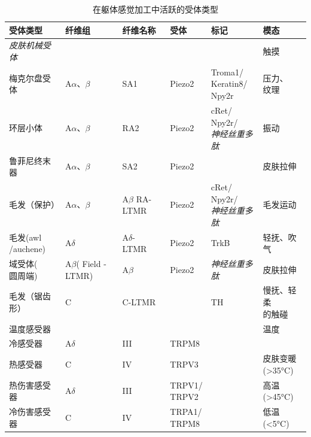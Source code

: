 \begin{table}[htbp]
	\caption{在躯体感觉加工中活跃的受体类型} \label{tab:18_2} \centering
	\begin{tabular}{llllll}
		\toprule
		受体类型 & 纤维组 & 纤维名称 & 受体 & 标记 & 模态\\
		\midrule
		\textit{皮肤机械受体} & &  &  &  & 触摸 \\
		梅克尔盘受体 & A$\alpha$、$\beta$ & SA1 & Piezo2 & \makecell[l]{Troma1/\\Keratin8/\\Npy2r} & \makecell[l]{压力、\\纹理} \\
		环层小体 & A$\alpha$、$\beta$ & RA2 & Piezo2 & \makecell[l]{cRet/\\Npy2r/\\\textit{神经丝重多肽}} & 振动 \\
		鲁菲尼终末器 & A$\alpha$、$\beta$ & SA2 & Piezo2 &  & 皮肤拉伸 \\
		毛发（保护） & A$\alpha$、$\beta$ & A$\beta$ RA-LTMR & Piezo2 & \makecell{cRet/\\Npy2r/\\\textit{神经丝重多肽}} & 毛发运动 \\
		\makecell[l]{毛发(awl\\/auchene)} & A$\delta$ & \makecell[l]{A$\delta$-\\LTMR} & Piezo2 & TrkB & 轻抚、吹气 \\
		\makecell[l]{域受体(\\圆周端)} & \makecell[l]{A$\beta$(\\Field\\-LTMR)} & A$\beta$ & Piezo2 & \textit{神经丝重多肽} & 皮肤拉伸 \\
		毛发（锯齿形） & C & C-LTMR &  & TH & \makecell[l]{慢抚、轻柔\\的触碰} \\
		温度感受器 &  &  &  &  & 温度 \\
		冷感受器 & A$\delta$ & III & TRPM8 &  & \makecell[l]{皮肤冷却(<25°C)} \\
		热感受器 & C & IV & TRPV3 &  & \makecell[l]{皮肤变暖\\(>35°C)} \\
		热伤害感受器 & A$\delta$ & III & \makecell[l]{TRPV1/\\TRPV2} &  & 高温(>45°C) \\
		冷伤害感受器 & C & IV & \makecell[l]{TRPA1/\\TRPM8} &  & 低温(<5°C) \\

\end{tabular}
\end{table}
